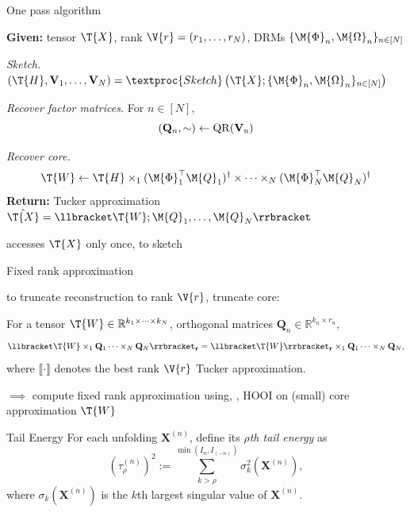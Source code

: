 \documentclass[handout,xcolor={usenames,dvipsnames}]{beamer}
\begin{document}
\begin{frame}{One pass algorithm}

\begin{algorithm}[H]
	\caption{One Pass Sketch and Low Rank Recovery}
	\textbf{Given:} tensor $\T{X}$, rank $\V{r} = (r_1, \ldots, r_N)$,
	DRMs $\{\M{\Phi}_n, \M{\Omega}_n\}_{n \in [N]}$
	\bit
	\item \emph{Sketch.}
	$\left(\T{H}, \mathbf{V}_1, \ldots, \mathbf{V}_N\right) =
	\textproc{Sketch}\left(\T{X}; \{\M{\Phi}_n, \M{\Omega}_n\}_{n \in [N]}\right)$

	\item \emph{Recover factor matrices.} For $n \in [N]$,
	\[
	(\mathbf{Q}_n, \sim) \leftarrow \rm{QR}(\mathbf{V}_n)
	\]
	\item \emph{Recover core.}
	\[
	\T{W} \leftarrow \T{H} \times_1 (\M{\Phi}_1^\top \M{Q}_1)^\dagger \times \cdots \times_N (\M{\Phi}_N^\top \M{Q}_N)^\dagger
	\]  %
	\eit
	\textbf{Return:} Tucker approximation $\hat{\T{X}} = \llbracket\T{W}; \M{Q}_1, \ldots, \M{Q}_N \rrbracket$
\end{algorithm}
\pause accesses $\T{X}$ only once, to sketch

\end{frame}


\begin{frame}{Fixed rank approximation}

to truncate reconstruction to rank $\V{r}$, truncate core:
\begin{lem}
	\label{lemma: equivalance_one_pass}
	For a tensor $\T{W}\in \mathbb{R}^{k_1 \times \cdots \times k_N}$,
	orthogonal matrices $\mathbf{Q}_n \in \mathbb{R}^{k_n\times r_n}$,%
	\[
	\llbracket \T{W}\times_1 \mathbf{Q}_1 \cdots \times_N \mathbf{Q}_N \rrbracket_\mathbf{r} =
	\llbracket \T{W} \rrbracket_\mathbf{r} \times_1 \mathbf{Q}_1 \cdots \times_N \mathbf{Q}_N,
	\]
	where $\llbracket \cdot \rrbracket$ denotes the best rank $\V{r}$ Tucker approximation.
\end{lem}
\pause
$\implies$ compute fixed rank approximation using, \eg, HOOI on (small) core approximation $\T{W}$

\end{frame}


\begin{frame}{Tail Energy}
For each unfolding $\mathbf{X}^{(n)}$,
define its $\rho$\textit{th tail energy} as
\[
(\tau_\rho^{(n)})^2 := \sum_{k>\rho}^{\min(I_n,I_{(-n)})} \sigma_{k}^2(\mathbf{X}^{(n)}),
\]
where $\sigma_{k}(\mathbf{X}^{(n)})$ is the $k$th largest singular value of $\mathbf{X}^{(n)}$.
\end{frame}
\end{document}
